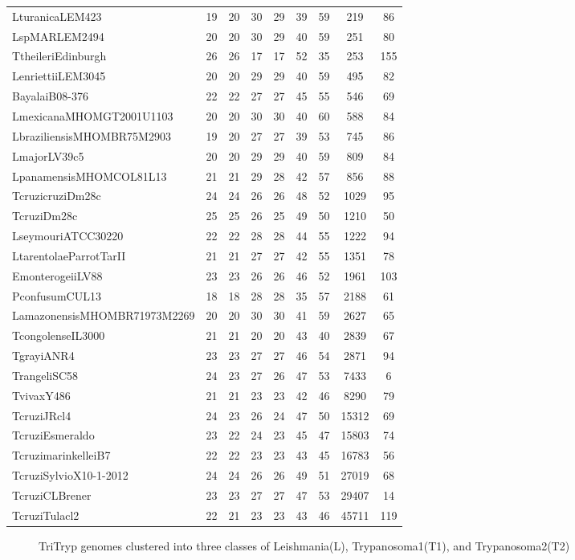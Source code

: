 \documentclass[table,
12pt, %
a4paper, %
oneside, %
headinclude,footinclude, %
BCOR5mm, %
]{scrartcl}
\begin{document}
\begin{table}[htbp]
\begin{adjustbox}{center}
\begin{tabular}{|l|cccccccc|}
LturanicaLEM423&19&20&30&29&39&59&219&86\\
LspMARLEM2494&20&20&30&29&40&59&251&80\\
TtheileriEdinburgh&26&26&17&17&52&35&253&155\\
LenriettiiLEM3045&20&20&29&29&40&59&495&82\\
BayalaiB08-376&22&22&27&27&45&55&546&69\\
LmexicanaMHOMGT2001U1103&20&20&30&30&40&60&588&84\\
LbraziliensisMHOMBR75M2903&19&20&27&27&39&53&745&86\\
LmajorLV39c5&20&20&29&29&40&59&809&84\\
LpanamensisMHOMCOL81L13&21&21&29&28&42&57&856&88\\
TcruzicruziDm28c&24&24&26&26&48&52&1029&95\\
TcruziDm28c&25&25&26&25&49&50&1210&50\\
LseymouriATCC30220&22&22&28&28&44&55&1222&94\\
LtarentolaeParrotTarII&21&21&27&27&42&55&1351&78\\
EmonterogeiiLV88&23&23&26&26&46&52&1961&103\\
PconfusumCUL13&18&18&28&28&35&57&2188&61\\
LamazonensisMHOMBR71973M2269&20&20&30&30&41&59&2627&65\\
TcongolenseIL3000&21&21&20&20&43&40&2839&67\\
TgrayiANR4&23&23&27&27&46&54&2871&94\\
TrangeliSC58&24&23&27&26&47&53&7433&6\\
TvivaxY486&21&21&23&23&42&46&8290&79\\
TcruziJRcl4&24&23&26&24&47&50&15312&69\\
TcruziEsmeraldo&23&22&24&23&45&47&15803&74\\
TcruzimarinkelleiB7&22&22&23&23&43&45&16783&56\\
TcruziSylvioX10-1-2012&24&24&26&26&49&51&27019&68\\
TcruziCLBrener&23&23&27&27&47&53&29407&14\\
TcruziTulacl2&22&21&23&23&43&46&45711&119\\  \hline\hline
\end{tabular}
\label{table:3}
\end{adjustbox}
\end{table}


\begin{figure}[H]
\centering 
{}
\caption[]{TriTryp genomes clustered into three classes of Leishmania(L), Trypanosoma1(T1), and Trypanosoma2(T2)}
\label{fig:Flogo} 
\end{figure}
\end{document}
